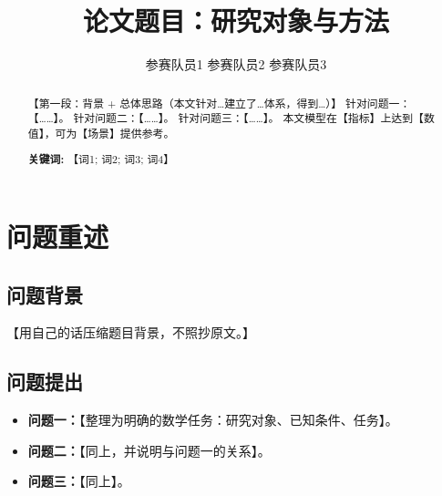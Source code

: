 \documentclass[11pt]{ctexart}
\title{\textbf{论文题目：研究对象与方法}}
\author{参赛队员1 \quad 参赛队员2 \quad 参赛队员3}
\date{}
\begin{document}
\maketitle

\begin{abstract}
【第一段：背景 + 总体思路（本文针对…建立了…体系，得到…）】
针对问题一：【……】。
针对问题二：【……】。
针对问题三：【……】。
本文模型在【指标】上达到【数值】，可为【场景】提供参考。

\noindent\textbf{关键词:} 【词1; 词2; 词3; 词4】%
\end{abstract}

\section{问题重述}%
\subsection{问题背景}
【用自己的话压缩题目背景，不照抄原文。】

\subsection{问题提出}
\begin{itemize}
  \item \textbf{问题一：}【整理为明确的数学任务：研究对象、已知条件、任务】。
  \item \textbf{问题二：}【同上，并说明与问题一的关系】。
  \item \textbf{问题三：}【同上】。
\end{itemize}

\end{document}
